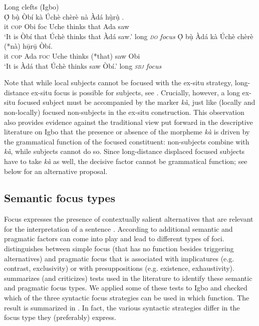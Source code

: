 \documentclass[output=paper,colorlinks,citecolor=brown]{langscibook}
\begin{document}
\ea%
    \label{ex:amaechi:8}
    Long clefts (Igbo)\\
    \ea\label{ex:amaechi:8a}
    \gll    Ọ́ bụ̀ Òbí kà Úchè chèrè nà Àdá hụ̀rụ̀ {\longrule}.\\
	        it \textsc{cop} Obi foc Uche thinks that Ada saw {}\\
    \glt    `It is Òbí that Úchè thinks that Àdá saw.' \hfill{\small long \textit{\textsc{do} focus}}
    \ex\label{ex:amaechi:8b}
    \gll    Ọ́ bụ̀ Àdá kà Úchè chèrè (*nà) {\longrule} hụ̄rụ̄ Òbí.\\
	        it \textsc{cop} Ada \textsc{foc} Uche thinks (*that) {} saw Obi\\
    \glt    `It is Àdá that Úchè thinks saw Òbí.' \hfill{\small long \textit{\textsc{sbj} focus}}
    \z
\z

Note that while local subjects cannot be focused with the ex-situ strategy, long-distance ex-situ focus is possible for subjects, see . Crucially, however, a long ex-situ focused subject must be accompanied by the marker \textit{k\`a}, just like (locally and non-locally) focused non-subjects in the ex-situ construction. This observation also provides evidence against the traditional view put forward in the descriptive literature on Igbo that the presence or absence of the morpheme \textit{k\`a} is driven by the grammatical function of the focused constituent: non-subjects combine with \textit{k\`a}, while subjects cannot do so. Since long-distance displaced focused subjects have to take \textit{k\`a} as well, the decisive factor cannot be grammatical function; see below for an alternative proposal.

\subsection{Semantic focus types}\label{sec:amaechi:2.2}

Focus expresses the presence of contextually salient alternatives that are relevant for the interpretation of a sentence \citep{Rooth1985, Rooth1992}. According to \citet{ZimmermannOnea2011} additional semantic and pragmatic factors can come into play and lead to different types of foci. \citet{Bazalgette2015} distinguishes between simple focus (that has no function besides triggering alternatives) and pragmatic focus that is associated with implicatures (e.g. contrast, exclusivity) or with presuppositions (e.g. existence, exhaustivity). \Textcite{VanDerWal2016} summarizes (and criticizes) tests used in the literature to identify these semantic and pragmatic focus types. We applied some of these tests to Igbo and checked which of the three syntactic focus strategies can be used in which function. The result is summarized in . In fact, the various syntactic strategies differ in the focus type they (preferably) express.
\end{document}
